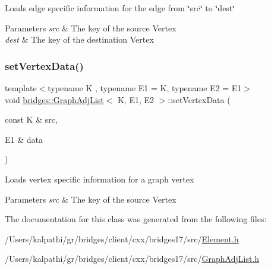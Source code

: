 Loads edge specific information for the edge from \char`\"{}src\char`\"{} to \char`\"{}dest\char`\"{}


\begin{DoxyParams}{Parameters}
{\em src} & The key of the source Vertex \\
\hline
{\em dest} & The key of the destination Vertex \\
\hline
\end{DoxyParams}
\mbox{\label{classbridges_1_1_graph_adj_list_aa30a944a429e0422cbe0ddd7bdbd353b}} 
\subsubsection{\texorpdfstring{set\+Vertex\+Data()}{setVertexData()}}
{\footnotesize\ttfamily template$<$typename K , typename E1  = K, typename E2  = E1$>$ \\
void \mbox{\hyperlink{classbridges_1_1_graph_adj_list}{bridges\+::\+Graph\+Adj\+List}}$<$ K, E1, E2 $>$\+::set\+Vertex\+Data (\begin{DoxyParamCaption}\item[{const K \&}]{src,  }\item[{E1 \&}]{data }\end{DoxyParamCaption})\hspace{0.3cm}{\ttfamily [inline]}}

Loads vertex specific information for a graph vertex


\begin{DoxyParams}{Parameters}
{\em src} & The key of the source Vertex \\
\hline
\end{DoxyParams}


The documentation for this class was generated from the following files\+:\begin{DoxyCompactItemize}
\item 
/\+Users/kalpathi/gr/bridges/client/cxx/bridges17/src/\mbox{\hyperlink{_element_8h}{Element.\+h}}\item 
/\+Users/kalpathi/gr/bridges/client/cxx/bridges17/src/\mbox{\hyperlink{_graph_adj_list_8h}{Graph\+Adj\+List.\+h}}\end{DoxyCompactItemize}
